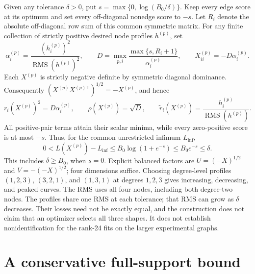 \documentclass[aps,pre,onecolumn,10pt,superscriptaddress]{revtex4-2}
\newcommand{\RMS}{\operatorname{RMS}}
\begin{document}
Given any tolerance \(\delta>0\), put \(s=\max\{0,\log(B_0/\delta)\}\).
Keep every edge score at its optimum and set every off-diagonal nonedge score to \(-s\).
Let \(R_i\) denote the absolute off-diagonal row sum of this common symmetric matrix.
For any finite collection of strictly positive desired node profiles \(h^{(p)}\), set
\begin{equation}
 \alpha_i^{(p)}=\frac{(h_i^{(p)})^2}{\RMS(h^{(p)})^2},
 \qquad
 D=\max_{p,i}\frac{\max\{s,R_i+1\}}{\alpha_i^{(p)}},
 \qquad X_{ii}^{(p)}=-D\alpha_i^{(p)}.
\end{equation}
Each \(X^{(p)}\) is strictly negative definite by symmetric diagonal dominance.
Consequently \((X^{(p)}X^{(p)\top})^{1/2}=-X^{(p)}\), and hence
\begin{equation}
 r_i(X^{(p)})^2=D\alpha_i^{(p)},\qquad
 \rho(X^{(p)})=\sqrt D,\qquad
 \widetilde r_i(X^{(p)})=\frac{h_i^{(p)}}{\RMS(h^{(p)})}.
\end{equation}
All positive-pair terms attain their scalar minima, while every zero-positive score is at most \(-s\).
Thus, for the common unrestricted infimum \(L_{\inf}\),
\begin{equation}
 0<L(X^{(p)})-L_{\inf}
 \le B_0\log(1+e^{-s})\le B_0e^{-s}\le\delta.
\end{equation}
This includes \(\delta\ge B_0\), when \(s=0\).
Explicit balanced factors are \(U=(-X)^{1/2}\) and \(V=-(-X)^{1/2}\); four dimensions suffice.
Choosing degree-level profiles \((1,2,3)\), \((3,2,1)\), and \((1,3,1)\) at degrees \(1,2,3\) gives increasing, decreasing, and peaked curves.
The RMS uses all four nodes, including both degree-two nodes.
The profiles share one RMS at each tolerance; that RMS can grow as \(\delta\) decreases.
Their losses need not be exactly equal, and the construction does not claim that an optimizer selects all three shapes.
It does not establish nonidentification for the rank-24 fits on the larger experimental graphs.

\section{A conservative full-support bound}
\end{document}
